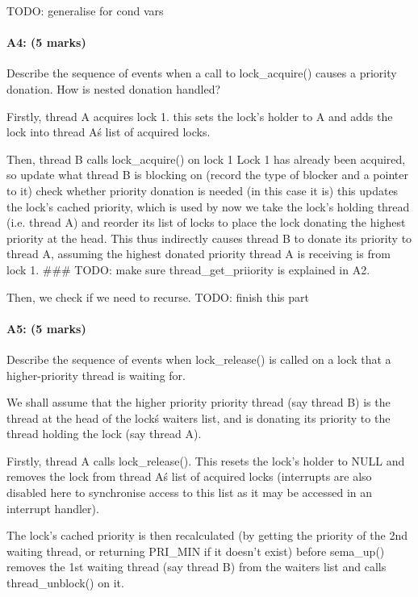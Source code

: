 TODO: generalise for cond vars

\paragraph{A4: (5 marks)}
Describe the sequence of events when a call to lock\_acquire() causes a priority donation.  How is nested donation handled?

  Firstly, thread A acquires lock 1.
    this sets the lock's holder to A and adds the lock into thread A\'s list of acquired locks.

  Then, thread B calls lock\_acquire() on lock 1
  Lock 1 has already been acquired, so
    update what thread B is blocking on (record the type of blocker and a pointer to it)
    check whether priority donation is needed (in this case it is)
      this updates the lock's cached priority, which is used by 
    now we take the lock's holding thread (i.e. thread A) and reorder its list of locks to place the lock donating the highest priority at the head. This thus indirectly causes thread B to donate its priority to thread A, assuming the highest donated priority thread A is receiving is from lock 1.
    \#\#\# TODO: make sure thread\_get\_priiority is explained in A2.

    Then, we check if we need to recurse. TODO: finish this part

\paragraph{A5: (5 marks)}
Describe the sequence of events when lock\_release() is called on a lock that a higher-priority thread is waiting for.

We shall assume that the higher priority priority thread (say thread B) is the thread at the head of the lock\'s waiters list, and is donating its priority to the thread holding the lock (say thread A).

Firstly, thread A calls lock\_release(). This resets the lock's holder to NULL and removes the lock from thread A\'s list of acquired locks (interrupts are also disabled here to synchronise access to this list as it may be accessed in an interrupt handler).

The lock's cached priority is then recalculated (by getting the priority of the 2nd waiting thread, or returning PRI\_MIN if it doesn't exist) before sema\_up() removes the 1st waiting thread (say thread B) from the waiters list and calls thread\_unblock() on it.

